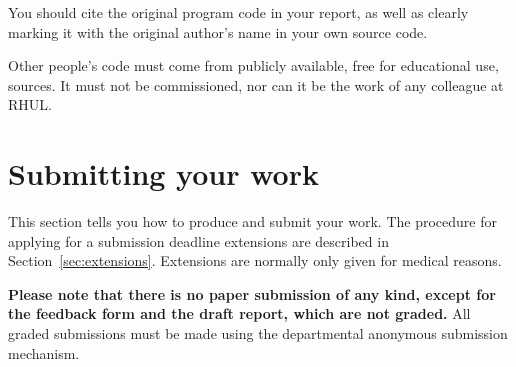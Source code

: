 \documentclass[11pt]{article}
\begin{document}
You should cite the original program code in your report, as well as clearly marking it with the original author's name in your own source code.

Other people's code must come from publicly available, free for educational use, sources.  It must not be commissioned, nor can it be the work of any colleague at RHUL.


\newpage
\section{Submitting your work}
\label{sec:whatToSubmit}
This section tells you how to produce and submit your work. The procedure for applying for a submission deadline extensions are described in Section~\ref{sec:extensions}.  Extensions are normally only given for medical reasons.

\textbf{Please note that there is no paper submission of any kind, except for the feedback form and the draft report, which are not graded.}  All graded submissions must be made using the departmental anonymous submission mechanism.
\end{document}
